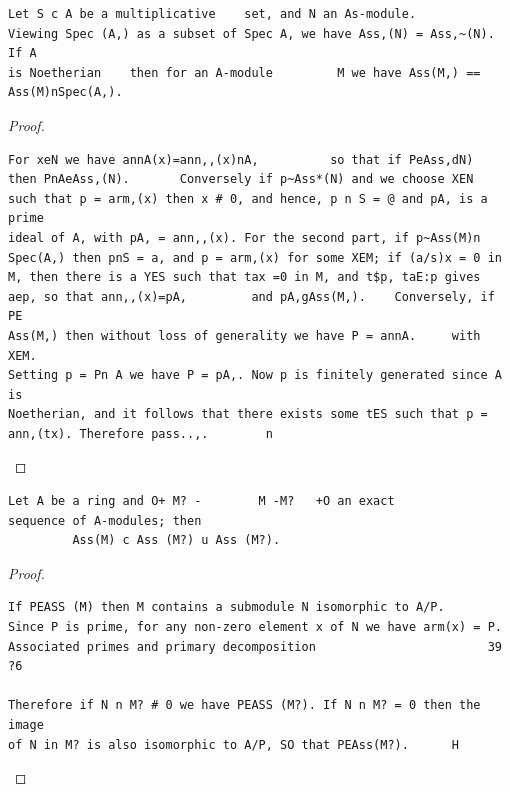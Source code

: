 \begin{theorem}\label{mcrt-auto-theorem-6-2}\uses{}
\begin{verbatim}
Let S c A be a multiplicative    set, and N an As-module.
Viewing Spec (A,) as a subset of Spec A, we have Ass,(N) = Ass,~(N). If A
is Noetherian    then for an A-module         M we have Ass(M,) ==
Ass(M)nSpec(A,).
\end{verbatim}
\end{theorem}
\begin{proof}
\begin{verbatim}
For xeN we have annA(x)=ann,,(x)nA,          so that if PeAss,dN)
then PnAeAss,(N).       Conversely if p~Ass*(N) and we choose XEN
such that p = arm,(x) then x # 0, and hence, p n S = @ and pA, is a prime
ideal of A, with pA, = ann,,(x). For the second part, if p~Ass(M)n
Spec(A,) then pnS = a, and p = arm,(x) for some XEM; if (a/s)x = 0 in
M, then there is a YES such that tax =0 in M, and t$p, taE:p gives
aep, so that ann,,(x)=pA,         and pA,gAss(M,).    Conversely, if PE
Ass(M,) then without loss of generality we have P = annA.     with XEM.
Setting p = Pn A we have P = pA,. Now p is finitely generated since A is
Noetherian, and it follows that there exists some tES such that p =
ann,(tx). Therefore pass..,.        n
\end{verbatim}
\end{proof}


\begin{theorem}\label{mcrt-auto-theorem-6-3}\uses{}
\begin{verbatim}
Let A be a ring and O+ M? -        M -M?   +O an exact
sequence of A-modules; then
         Ass(M) c Ass (M?) u Ass (M?).
\end{verbatim}
\end{theorem}
\begin{proof}
\begin{verbatim}
If PEASS (M) then M contains a submodule N isomorphic to A/P.
Since P is prime, for any non-zero element x of N we have arm(x) = P.
Associated primes and primary decomposition                        39
?6

Therefore if N n M? # 0 we have PEASS (M?). If N n M? = 0 then the image
of N in M? is also isomorphic to A/P, SO that PEAss(M?).      H
\end{verbatim}
\end{proof}


